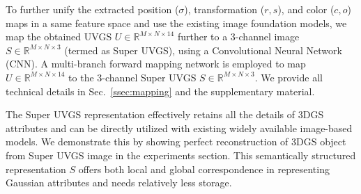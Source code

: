%
To further unify the extracted position ($\sigma$), transformation ($r, s$), and color ($c, o$) maps in a same feature space and use the existing image foundation models, we map the obtained UVGS $U \in \mathbb{R}^{M\times N \times14}$ further to a 3-channel image $S \in \mathbb{R}^{M\times N \times 3}$ (termed as Super UVGS), using a Convolutional Neural Network (CNN).
A multi-branch forward mapping network is employed to map $U \in \mathbb{R}^{M\times N \times14}$ to the 3-channel Super UVGS $S \in \mathbb{R}^{M\times N \times 3}$. We provide all technical details in Sec.~\ref{ssec:mapping} and the supplementary material. 

The Super UVGS representation effectively retains all the details of 3DGS attributes and can be directly utilized with existing widely available image-based models. 
We demonstrate this by showing perfect reconstruction of 3DGS object from Super UVGS image in the experiments section.
This semantically structured representation $S$ offers both local and global correspondence 
in representing Gaussian attributes and needs relatively less storage. 

